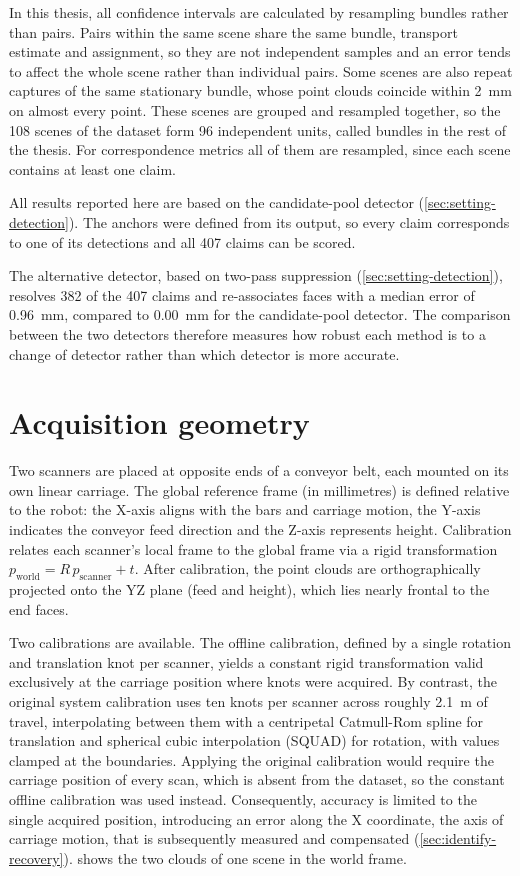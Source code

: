 \documentclass[a4paper, 12pt, twoside]{book}
\begin{document}
In this thesis, all confidence intervals are calculated by resampling bundles rather than pairs. Pairs within the same scene share the same bundle, transport estimate and assignment, so they are not independent samples and an error tends to affect the whole scene rather than individual pairs. Some scenes are also repeat captures of the same stationary bundle, whose point clouds coincide within 2~mm on almost every point. These scenes are grouped and resampled together, so the 108 scenes of the dataset form 96 independent units, called bundles in the rest of the thesis. For correspondence metrics all of them are resampled, since each scene contains at least one claim.

All results reported here are based on the candidate-pool detector (\cref{sec:setting-detection}). The anchors were defined from its output, so every claim corresponds to one of its detections and all 407 claims can be scored.

The alternative detector, based on two-pass suppression (\cref{sec:setting-detection}), resolves 382 of the 407 claims and re-associates faces with a median error of 0.96~mm, compared to 0.00~mm for the candidate-pool detector. The comparison between the two detectors therefore measures how robust each method is to a change of detector rather than which detector is more accurate.

\section{Acquisition geometry}
\label{sec:setting-geometry}

Two scanners are placed at opposite ends of a conveyor belt, each mounted on its own linear carriage. The global reference frame (in millimetres) is defined relative to the robot: the X-axis aligns with the bars and carriage motion, the Y-axis indicates the conveyor feed direction and the Z-axis represents height. Calibration relates each scanner's local frame to the global frame via a rigid transformation $p_{\text{world}} = R\,p_{\text{scanner}} + t$.
After calibration, the point clouds are orthographically projected onto the YZ plane (feed and height), which lies nearly frontal to the end faces.

Two calibrations are available. The offline calibration, defined by a single rotation and translation knot per scanner, yields a constant rigid transformation valid exclusively at the carriage position where knots were acquired. By contrast, the original system calibration uses ten knots per scanner across roughly 2.1~m of travel, interpolating between them with a centripetal Catmull-Rom spline for translation and spherical cubic interpolation (SQUAD) for rotation, with values clamped at the boundaries.
Applying the original calibration would require the carriage position of every scan, which is absent from the dataset, so the constant offline calibration was used instead. Consequently, accuracy is limited to the single acquired position, introducing an error along the X coordinate, the axis of carriage motion, that is subsequently measured and compensated (\cref{sec:identify-recovery}).  shows the two clouds of one scene in the world frame.
\end{document}
